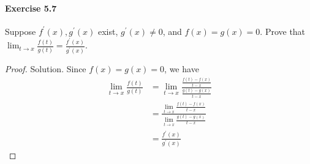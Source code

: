 \documentclass{article}
\theoremstyle{definition}
\begin{document}
\paragraph{Exercise 5.7} Suppose $f^{\prime}(x), g^{\prime}(x)$ exist, $g^{\prime}(x) \neq 0$, and $f(x)=g(x)=0$. Prove that $\lim _{t \rightarrow x} \frac{f(t)}{g(t)}=\frac{f^{\prime}(x)}{g^{\prime}(x)}.$
\begin{proof}
    Solution. Since $f(x)=g(x)=0$, we have
$$
\begin{aligned}
\lim _{t \rightarrow x} \frac{f(t)}{g(t)} &=\lim _{t \rightarrow x} \frac{\frac{f(t)-f(x)}{t-x}}{\frac{g(t)-g(x)}{t-x}} \\
&=\frac{\lim _{t \rightarrow x} \frac{f(t)-f(x)}{t-x}}{\lim _{t \rightarrow x} \frac{g(t)-g(x)}{t-x}} \\
&=\frac{f^{\prime}(x)}{g^{\prime}(x)}
\end{aligned}
$$
\end{proof}
\end{document}
